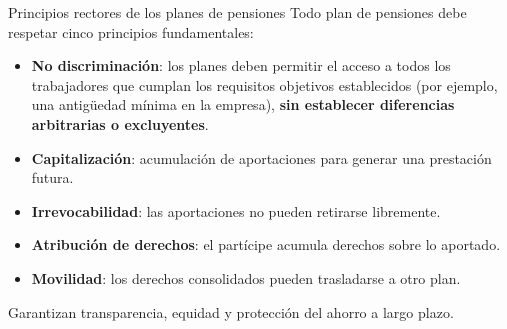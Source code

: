 \documentclass[
  ignorenonframetext,
  aspectratio=54,
  spanish,
]{beamer}
\providecommand{\tightlist}{%
  \setlength{\itemsep}{0pt}\setlength{\parskip}{0pt}}
\begin{document}
\begin{frame}{Principios rectores de los planes de pensiones}
\label{principios-rectores-de-los-planes-de-pensiones}
Todo plan de pensiones debe respetar cinco principios fundamentales:

\begin{itemize}
\tightlist
\item
  \textbf{No discriminación}: los planes deben permitir el acceso a
  todos los trabajadores que cumplan los requisitos objetivos
  establecidos (por ejemplo, una antigüedad mínima en la empresa),
  \textbf{sin establecer diferencias arbitrarias o excluyentes}.
\item
  \textbf{Capitalización}: acumulación de aportaciones para generar una
  prestación futura.
\item
  \textbf{Irrevocabilidad}: las aportaciones no pueden retirarse
  libremente.
\item
  \textbf{Atribución de derechos}: el partícipe acumula derechos sobre
  lo aportado.
\item
  \textbf{Movilidad}: los derechos consolidados pueden trasladarse a
  otro plan.
\end{itemize}

\begin{tcolorbox}[enhanced jigsaw, rightrule=.15mm, colback=white, arc=.35mm, colframe=quarto-callout-note-color-frame, bottomrule=.15mm, left=2mm, toptitle=1mm, colbacktitle=quarto-callout-note-color!10!white, leftrule=.75mm, bottomtitle=1mm, titlerule=0mm, title=\textcolor{quarto-callout-note-color}{\faInfo}\hspace{0.5em}{Nota}, opacityback=0, coltitle=black, toprule=.15mm, opacitybacktitle=0.6, breakable]

Garantizan transparencia, equidad y protección del ahorro a largo plazo.

\end{tcolorbox}
\end{frame}
\end{document}
